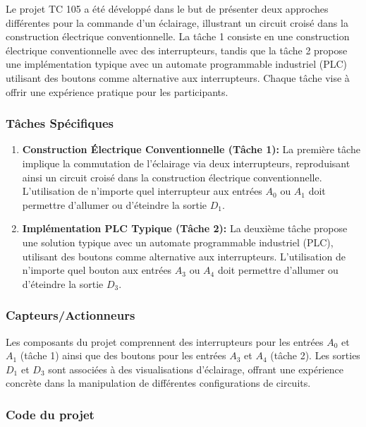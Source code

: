 \documentclass[a4paper,12pt]{report}
\begin{document}
Le projet TC 105 a été développé dans le but de présenter deux approches différentes pour la commande d'un éclairage, illustrant un circuit croisé dans la construction électrique conventionnelle. La tâche 1 consiste en une construction électrique conventionnelle avec des interrupteurs, tandis que la tâche 2 propose une implémentation typique avec un automate programmable industriel (PLC) utilisant des boutons comme alternative aux interrupteurs. Chaque tâche vise à offrir une expérience pratique pour les participants.

\subsubsection{Tâches Spécifiques}

\begin{enumerate}
    \item \textbf{Construction Électrique Conventionnelle (Tâche 1):} La première tâche implique la commutation de l'éclairage via deux interrupteurs, reproduisant ainsi un circuit croisé dans la construction électrique conventionnelle. L'utilisation de n'importe quel interrupteur aux entrées \(A_0\) ou \(A_1\) doit permettre d'allumer ou d'éteindre la sortie \(D_1\).
    
    \item \textbf{Implémentation PLC Typique (Tâche 2):} La deuxième tâche propose une solution typique avec un automate programmable industriel (PLC), utilisant des boutons comme alternative aux interrupteurs. L'utilisation de n'importe quel bouton aux entrées \(A_3\) ou \(A_4\) doit permettre d'allumer ou d'éteindre la sortie \(D_3\).
\end{enumerate}

\subsubsection{Capteurs/Actionneurs}

Les composants du projet comprennent des interrupteurs pour les entrées \(A_0\) et \(A_1\) (tâche 1) ainsi que des boutons pour les entrées \(A_3\) et \(A_4\) (tâche 2). Les sorties \(D_1\) et \(D_3\) sont associées à des visualisations d'éclairage, offrant une expérience concrète dans la manipulation de différentes configurations de circuits.

\subsubsection{Code du projet}
\end{document}
